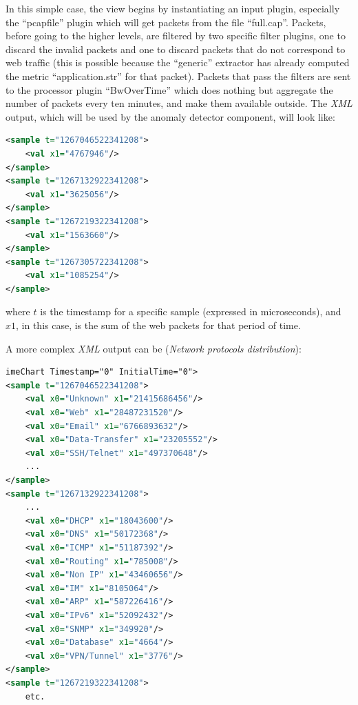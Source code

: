 \documentclass[12pt,a4paper,cucitura]{toptesi}
\begin{document}
In this simple case, the view begins by instantiating an input plugin, especially the ``pcapfile'' plugin which will get packets from  the file ``full.cap''. Packets, before going to the higher levels, are filtered by two specific filter plugins, one to discard the invalid packets and one to discard packets that do not correspond to web traffic (this is possible because the ``generic'' extractor has already computed the metric ``application.str'' for that packet). 
Packets that pass the filters are sent to the processor plugin ``BwOverTime'' which does nothing but aggregate the number of packets every ten minutes, and make them available outside.
The \emph{XML} output, which will be used by the anomaly detector component, will look like:

\begin{lstlisting}[frame=shadowbox,caption=Web bandwidth over time \emph{XML} output,language=XML,tabsize=2,basicstyle=\scriptsize]
<sample t="1267046522341208">
	<val x1="4767946"/>
</sample>
<sample t="1267132922341208">
	<val x1="3625056"/>
</sample>
<sample t="1267219322341208">
	<val x1="1563660"/>
</sample>
<sample t="1267305722341208">
	<val x1="1085254"/>
</sample>
\end{lstlisting}

where $t$ is the timestamp for a specific sample (expressed in microseconds), and $x1$, in this case, is the sum of the web packets for that period of time.

A more complex \emph{XML} output can be (\emph{Network protocols distribution}):

\begin{lstlisting}[frame=shadowbox,caption=Network protocols distribution \emph{XML} output,language=XML,tabsize=2,basicstyle=\scriptsize]
imeChart Timestamp="0" InitialTime="0">
<sample t="1267046522341208">
	<val x0="Unknown" x1="21415686456"/>
	<val x0="Web" x1="28487231520"/>
	<val x0="Email" x1="6766893632"/>
	<val x0="Data-Transfer" x1="23205552"/>
	<val x0="SSH/Telnet" x1="497370648"/>
	...
</sample>
<sample t="1267132922341208">
	...
	<val x0="DHCP" x1="18043600"/>
	<val x0="DNS" x1="50172368"/>
	<val x0="ICMP" x1="51187392"/>
	<val x0="Routing" x1="785008"/>
	<val x0="Non IP" x1="43460656"/>
	<val x0="IM" x1="8105064"/>
	<val x0="ARP" x1="587226416"/>
	<val x0="IPv6" x1="52092432"/>
	<val x0="SNMP" x1="349920"/>
	<val x0="Database" x1="4664"/>
	<val x0="VPN/Tunnel" x1="3776"/>
</sample>
<sample t="1267219322341208">
	etc.
\end{lstlisting}
\end{document}
